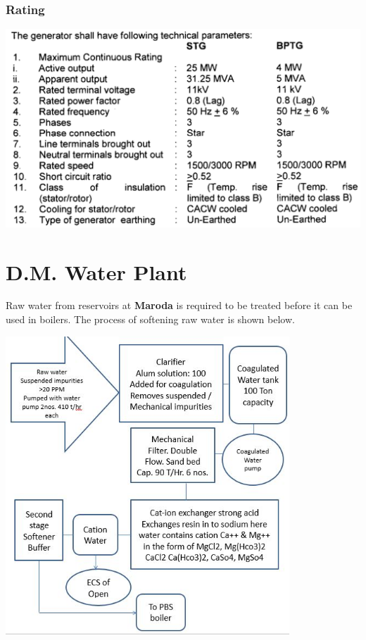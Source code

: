 \documentclass[english,11pt]{report}
\begin{document}
\begin{enumerate}
\subsection{Rating}
\includegraphics[width = 6in]{rating.png}


\end{enumerate}




\chapter{D.M. Water Plant}
Raw water from reservoirs at \textbf{Maroda} is required to be treated before it can be used in boilers. The process of softening raw water is shown below.\\
\begin{center}
\includegraphics[width = 4.2in]{dmprocess.png}\\
\end{center}
\end{document}
